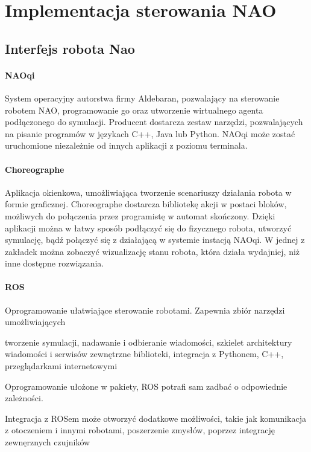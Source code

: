 \chapter{Implementacja sterowania NAO}
\section{Interfejs robota Nao}

\subsubsection{NAOqi} System operacyjny autorstwa firmy Aldebaran, pozwalający na sterowanie robotem NAO, programowanie go oraz utworzenie wirtualnego agenta podłączonego do symulacji. Producent dostarcza zestaw narzędzi, pozwalających na pisanie programów w językach C++, Java lub Python. NAOqi może zostać uruchomione niezależnie od innych aplikacji z poziomu terminala.

\subsubsection{Choreographe} Aplikacja okienkowa, umożliwiająca tworzenie scenariuszy działania robota w formie graficznej. Choreographe dostarcza bibliotekę akcji w postaci bloków, możliwych do połączenia przez programistę w automat skończony. Dzięki aplikacji można w łatwy sposób podłączyć się do fizycznego robota, utworzyć symulację, bądź połączyć się z działającą w systemie instacją NAOqi. W jednej z zakładek można zobaczyć wizualizację stanu robota, która działa wydajniej, niż inne dostępne rozwiązania.

\subsubsection{ROS} Oprogramowanie ułatwiające sterowanie robotami. Zapewnia zbiór narzędzi umożliwiających 

tworzenie symulacji, 
nadawanie i odbieranie wiadomości, 
szkielet architektury wiadomości i serwisów
zewnętrzne biblioteki, integracja z Pythonem, C++, przeglądarkami internetowymi

Oprogramowanie ułożone w pakiety, ROS potrafi sam zadbać o odpowiednie zależności.

Integracja z ROSem może otworzyć dodatkowe możliwości, takie jak komunikacja z otoczeniem i innymi robotami, poszerzenie zmysłów, poprzez integrację zewnęrznych czujników 




